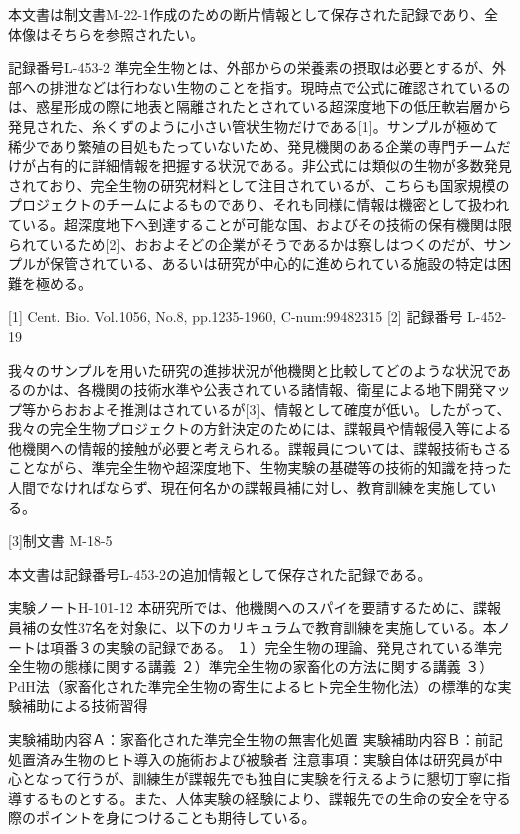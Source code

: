 本文書は制文書M-22-1作成のための断片情報として保存された記録であり、全体像はそちらを参照されたい。

記録番号L-453-2
準完全生物とは、外部からの栄養素の摂取は必要とするが、外部への排泄などは行わない生物のことを指す。現時点で公式に確認されているのは、惑星形成の際に地表と隔離されたとされている超深度地下の低圧軟岩層から発見された、糸くずのように小さい管状生物だけである[1]。サンプルが極めて稀少であり繁殖の目処もたっていないため、発見機関のある企業の専門チームだけが占有的に詳細情報を把握する状況である。非公式には類似の生物が多数発見されており、完全生物の研究材料として注目されているが、こちらも国家規模のプロジェクトのチームによるものであり、それも同様に情報は機密として扱われている。超深度地下へ到達することが可能な国、およびその技術の保有機関は限られているため[2]、おおよそどの企業がそうであるかは察しはつくのだが、サンプルが保管されている、あるいは研究が中心的に進められている施設の特定は困難を極める。

[1] Cent. Bio. Vol.1056, No.8, pp.1235-1960, C-num:99482315
[2] 記録番号 L-452-19

我々のサンプルを用いた研究の進捗状況が他機関と比較してどのような状況であるのかは、各機関の技術水準や公表されている諸情報、衛星による地下開発マップ等からおおよそ推測はされているが[3]、情報として確度が低い。したがって、我々の完全生物プロジェクトの方針決定のためには、諜報員や情報侵入等による他機関への情報的接触が必要と考えられる。諜報員については、諜報技術もさることながら、準完全生物や超深度地下、生物実験の基礎等の技術的知識を持った人間でなければならず、現在何名かの諜報員補に対し、教育訓練を実施している。

[3]制文書 M-18-5


本文書は記録番号L-453-2の追加情報として保存された記録である。

実験ノートH-101-12
本研究所では、他機関へのスパイを要請するために、諜報員補の女性37名を対象に、以下のカリキュラムで教育訓練を実施している。本ノートは項番３の実験の記録である。
１）完全生物の理論、発見されている準完全生物の態様に関する講義
２）準完全生物の家畜化の方法に関する講義
３）PdH法（家畜化された準完全生物の寄生によるヒト完全生物化法）の標準的な実験補助による技術習得

実験補助内容Ａ：家畜化された準完全生物の無害化処置
実験補助内容Ｂ：前記処置済み生物のヒト導入の施術および被験者
注意事項：実験自体は研究員が中心となって行うが、訓練生が諜報先でも独自に実験を行えるように懇切丁寧に指導するものとする。また、人体実験の経験により、諜報先での生命の安全を守る際のポイントを身につけることも期待している。

